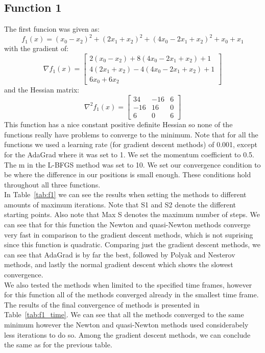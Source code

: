 \documentclass[9pt]{IEEEtran}
\begin{document}
\subsection{Function 1}
The first funcion was given as:
\[
f_1(x) = (x_0 - x_2)^2 + (2x_1 + x_2)^2 + (4x_0 - 2x_1 + x_2)^2 + x_0 + x_1
\]
with the gradient of:
\[
\nabla f_1(x) =
\begin{bmatrix}
2(x_0 - x_2) + 8(4x_0 - 2x_1 + x_2) + 1 \\
4(2x_1 + x_2) - 4(4x_0 - 2x_1 + x_2) + 1 \\
6x_0 + 6x_2
\end{bmatrix}
\]
and the Hessian matrix:
\[
\nabla^2 f_1(x) =
\begin{bmatrix}
34 & -16 & 6 \\
-16 & 16 & 0 \\
6 & 0 & 6
\end{bmatrix}
\]
This function has a nice constant positive definite Hessian so none of the 
functions really have problems to converge to the minimum. Note that for all the functions 
we used a learning rate (for gradient descent methods) of 0.001, except for the AdaGrad where 
it was set to 1. We set the momentum coefficient to 0.5. The m in the L-BFGS method
was set to 10. We set our convergence 
condition to be where the difference in our positions is small enough. These conditions hold throughout all three 
functions.
\\ In Table~\ref{tab:f1} we 
can see the results when setting the methods to different amounts of maximum iterations. Note 
that S1 and S2 denote the different starting points. Also note that Max S denotes the maximum number 
of steps.
We can see that for this function the Newton and quasi-Newton methods converge very fast in 
comparison to the gradient descent methods, which is not suprising since this function is quadratic. 
Comparing just the gradient descent methods, we can see that AdaGrad is by far the best, followed by 
Polyak and Nesterov methods, and lastly the normal gradient descent which shows the slowest convergence.  
\\
We also tested the methods when limited to the specified time frames, however for this function 
all of the methods converged already in the smallest time frame. The results of the final 
convergence of methods is presented in Table~\ref{tab:f1_time}. We can see that all the methods 
converged to the same minimum however the Newton and quasi-Newton methods used considerabely less 
iterations to do so. Among the gradient descent methods, we can conclude the same as for the previous 
table.
\end{document}
